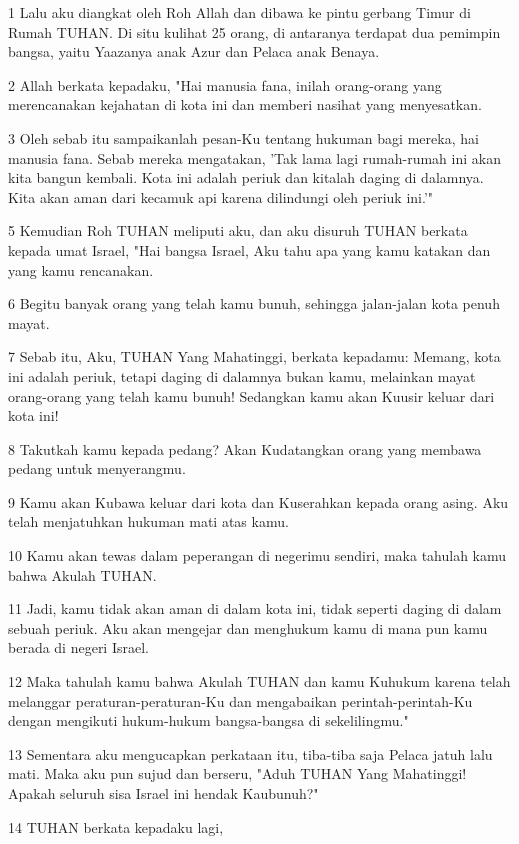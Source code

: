 \par 1 Lalu aku diangkat oleh Roh Allah dan dibawa ke pintu gerbang Timur di Rumah TUHAN. Di situ kulihat 25 orang, di antaranya terdapat dua pemimpin bangsa, yaitu Yaazanya anak Azur dan Pelaca anak Benaya.
\par 2 Allah berkata kepadaku, "Hai manusia fana, inilah orang-orang yang merencanakan kejahatan di kota ini dan memberi nasihat yang menyesatkan.
\par 3 Oleh sebab itu sampaikanlah pesan-Ku tentang hukuman bagi mereka, hai manusia fana. Sebab mereka mengatakan, 'Tak lama lagi rumah-rumah ini akan kita bangun kembali. Kota ini adalah periuk dan kitalah daging di dalamnya. Kita akan aman dari kecamuk api karena dilindungi oleh periuk ini.'"
\par 5 Kemudian Roh TUHAN meliputi aku, dan aku disuruh TUHAN berkata kepada umat Israel, "Hai bangsa Israel, Aku tahu apa yang kamu katakan dan yang kamu rencanakan.
\par 6 Begitu banyak orang yang telah kamu bunuh, sehingga jalan-jalan kota penuh mayat.
\par 7 Sebab itu, Aku, TUHAN Yang Mahatinggi, berkata kepadamu: Memang, kota ini adalah periuk, tetapi daging di dalamnya bukan kamu, melainkan mayat orang-orang yang telah kamu bunuh! Sedangkan kamu akan Kuusir keluar dari kota ini!
\par 8 Takutkah kamu kepada pedang? Akan Kudatangkan orang yang membawa pedang untuk menyerangmu.
\par 9 Kamu akan Kubawa keluar dari kota dan Kuserahkan kepada orang asing. Aku telah menjatuhkan hukuman mati atas kamu.
\par 10 Kamu akan tewas dalam peperangan di negerimu sendiri, maka tahulah kamu bahwa Akulah TUHAN.
\par 11 Jadi, kamu tidak akan aman di dalam kota ini, tidak seperti daging di dalam sebuah periuk. Aku akan mengejar dan menghukum kamu di mana pun kamu berada di negeri Israel.
\par 12 Maka tahulah kamu bahwa Akulah TUHAN dan kamu Kuhukum karena telah melanggar peraturan-peraturan-Ku dan mengabaikan perintah-perintah-Ku dengan mengikuti hukum-hukum bangsa-bangsa di sekelilingmu."
\par 13 Sementara aku mengucapkan perkataan itu, tiba-tiba saja Pelaca jatuh lalu mati. Maka aku pun sujud dan berseru, "Aduh TUHAN Yang Mahatinggi! Apakah seluruh sisa Israel ini hendak Kaubunuh?"
\par 14 TUHAN berkata kepadaku lagi,
